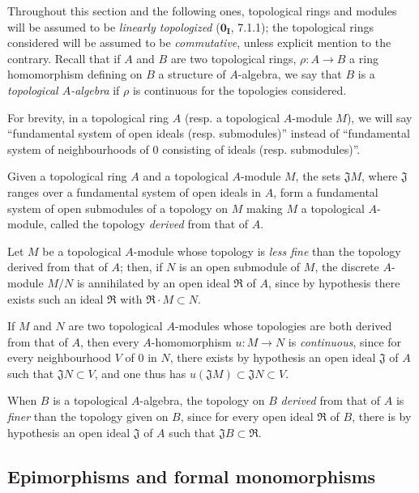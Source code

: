 \begin{env}[19.0.3]
\label{0.19.0.3}
Throughout this section and the following ones, topological rings and modules will be assumed to be \emph{linearly topologized} ($\mathbf{0_I}$, 7.1.1);
the topological rings considered will be assumed to be \emph{commutative}, unless explicit mention to the contrary.
Recall that if $A$ and $B$ are two topological rings, $\rho:A\to B$ a ring homomorphism defining on $B$ a structure of $A$-algebra, we say that $B$ is a \emph{topological $A$-algebra} if $\rho$ is continuous for the topologies considered.

For brevity, in a topological ring $A$ (resp. a topological $A$-module $M$), we will say ``fundamental system of open ideals (resp. submodules)'' instead of ``fundamental system of neighbourhoods of $0$ consisting of ideals (resp. submodules)''.

Given a topological ring $A$ and a topological $A$-module $M$, the sets $\mathfrak{J}M$, where $\mathfrak{J}$ ranges over a fundamental system of open ideals in $A$, form a fundamental system of open submodules of a topology on $M$ making $M$ a topological $A$-module, called the topology \emph{derived} from that of $A$.

Let $M$ be a topological $A$-module whose topology is \emph{less fine} than the topology derived from that of $A$;
then, if $N$ is an open submodule of $M$, the discrete $A$-module $M/N$ is annihilated by an open ideal $\mathfrak{R}$ of $A$, since by hypothesis there exists such an ideal $\mathfrak{R}$ with $\mathfrak{R}\cdot M\subset N$.

If $M$ and $N$ are two topological $A$-modules whose topologies are both derived from that of $A$, then every $A$-homomorphism $u:M\to N$ is \emph{continuous}, since for every neighbourhood $V$ of $0$ in $N$, there exists by hypothesis an open ideal $\mathfrak{J}$ of $A$ such that $\mathfrak{J}N\subset V$, and one thus has $u(\mathfrak{J}M)\subset\mathfrak{J}N\subset V$.

When $B$ is a topological $A$-algebra, the topology on $B$ \emph{derived} from that of $A$ is \emph{finer} than the topology given on $B$, since for every open ideal $\mathfrak{R}$ of $B$, there is by hypothesis an open ideal $\mathfrak{J}$ of $A$ such that $\mathfrak{J}B\subset\mathfrak{R}$.
\end{env}

\subsection{Epimorphisms and formal monomorphisms}
\label{subsection:0.19.1}


